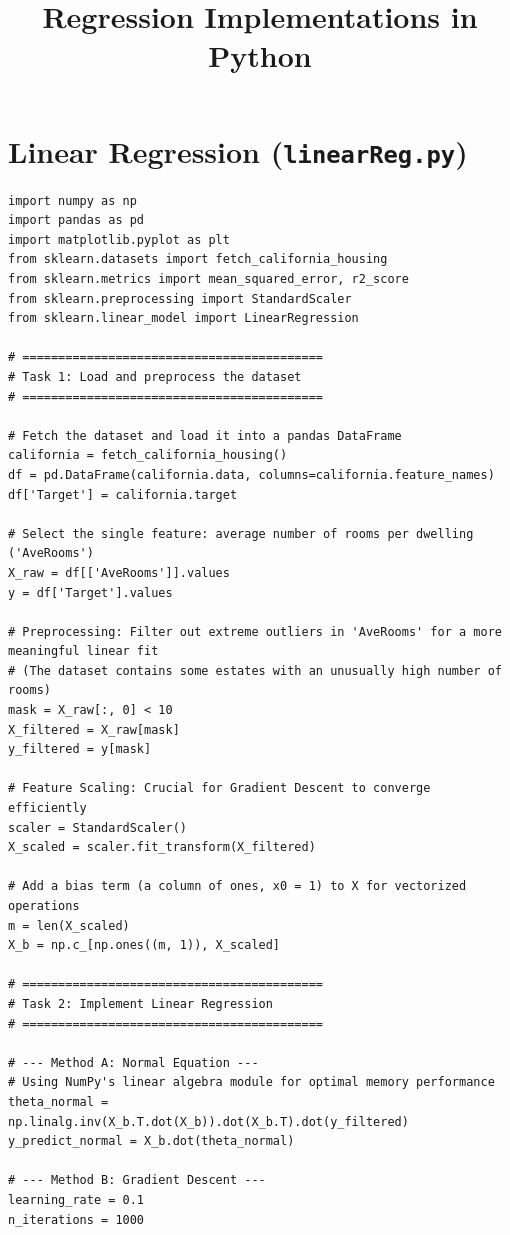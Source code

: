 \documentclass[11pt,a4paper]{article}
\begin{document}
\title{Regression Implementations in Python}
\author{}
\date{}
\maketitle

\section*{Linear Regression (\texttt{linearReg.py})}
\begin{lstlisting}
import numpy as np
import pandas as pd
import matplotlib.pyplot as plt
from sklearn.datasets import fetch_california_housing
from sklearn.metrics import mean_squared_error, r2_score
from sklearn.preprocessing import StandardScaler
from sklearn.linear_model import LinearRegression

# ==========================================
# Task 1: Load and preprocess the dataset
# ==========================================

# Fetch the dataset and load it into a pandas DataFrame
california = fetch_california_housing()
df = pd.DataFrame(california.data, columns=california.feature_names)
df['Target'] = california.target

# Select the single feature: average number of rooms per dwelling ('AveRooms')
X_raw = df[['AveRooms']].values
y = df['Target'].values

# Preprocessing: Filter out extreme outliers in 'AveRooms' for a more meaningful linear fit
# (The dataset contains some estates with an unusually high number of rooms)
mask = X_raw[:, 0] < 10 
X_filtered = X_raw[mask]
y_filtered = y[mask]

# Feature Scaling: Crucial for Gradient Descent to converge efficiently
scaler = StandardScaler()
X_scaled = scaler.fit_transform(X_filtered)

# Add a bias term (a column of ones, x0 = 1) to X for vectorized operations
m = len(X_scaled)
X_b = np.c_[np.ones((m, 1)), X_scaled]

# ==========================================
# Task 2: Implement Linear Regression
# ==========================================

# --- Method A: Normal Equation ---
# Using NumPy's linear algebra module for optimal memory performance
theta_normal = np.linalg.inv(X_b.T.dot(X_b)).dot(X_b.T).dot(y_filtered)
y_predict_normal = X_b.dot(theta_normal)

# --- Method B: Gradient Descent ---
learning_rate = 0.1
n_iterations = 1000


\end{lstlisting}
\end{document}
